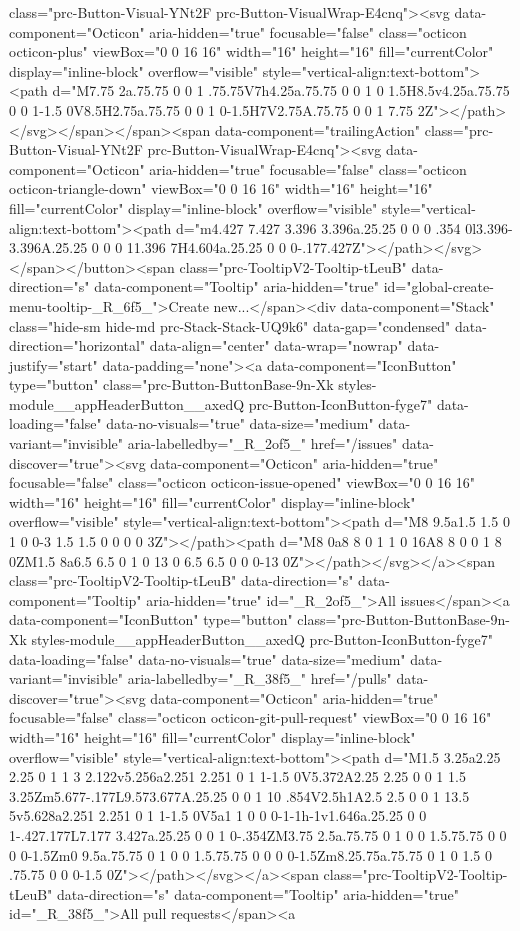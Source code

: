 {{{class="prc-Button-Visual-YNt2F prc-Button-VisualWrap-E4cnq"><svg data-component="Octicon" aria-hidden="true" focusable="false" class="octicon octicon-plus" viewBox="0 0 16 16" width="16" height="16" fill="currentColor" display="inline-block" overflow="visible" style="vertical-align:text-bottom"><path d="M7.75 2a.75.75 0 0 1 .75.75V7h4.25a.75.75 0 0 1 0 1.5H8.5v4.25a.75.75 0 0 1-1.5 0V8.5H2.75a.75.75 0 0 1 0-1.5H7V2.75A.75.75 0 0 1 7.75 2Z"></path></svg></span></span><span data-component="trailingAction" class="prc-Button-Visual-YNt2F prc-Button-VisualWrap-E4cnq"><svg data-component="Octicon" aria-hidden="true" focusable="false" class="octicon octicon-triangle-down" viewBox="0 0 16 16" width="16" height="16" fill="currentColor" display="inline-block" overflow="visible" style="vertical-align:text-bottom"><path d="m4.427 7.427 3.396 3.396a.25.25 0 0 0 .354 0l3.396-3.396A.25.25 0 0 0 11.396 7H4.604a.25.25 0 0 0-.177.427Z"></path></svg></span></button><span class="prc-TooltipV2-Tooltip-tLeuB" data-direction="s" data-component="Tooltip" aria-hidden="true" id="global-create-menu-tooltip-_R_6f5_">Create new...</span><div data-component="Stack" class="hide-sm hide-md prc-Stack-Stack-UQ9k6" data-gap="condensed" data-direction="horizontal" data-align="center" data-wrap="nowrap" data-justify="start" data-padding="none"><a data-component="IconButton" type="button" class="prc-Button-ButtonBase-9n-Xk styles-module__appHeaderButton__axedQ prc-Button-IconButton-fyge7" data-loading="false" data-no-visuals="true" data-size="medium" data-variant="invisible" aria-labelledby="_R_2of5_" href="/issues" data-discover="true"><svg data-component="Octicon" aria-hidden="true" focusable="false" class="octicon octicon-issue-opened" viewBox="0 0 16 16" width="16" height="16" fill="currentColor" display="inline-block" overflow="visible" style="vertical-align:text-bottom"><path d="M8 9.5a1.5 1.5 0 1 0 0-3 1.5 1.5 0 0 0 0 3Z"></path><path d="M8 0a8 8 0 1 1 0 16A8 8 0 0 1 8 0ZM1.5 8a6.5 6.5 0 1 0 13 0 6.5 6.5 0 0 0-13 0Z"></path></svg></a><span class="prc-TooltipV2-Tooltip-tLeuB" data-direction="s" data-component="Tooltip" aria-hidden="true" id="_R_2of5_">All issues</span><a data-component="IconButton" type="button" class="prc-Button-ButtonBase-9n-Xk styles-module__appHeaderButton__axedQ prc-Button-IconButton-fyge7" data-loading="false" data-no-visuals="true" data-size="medium" data-variant="invisible" aria-labelledby="_R_38f5_" href="/pulls" data-discover="true"><svg data-component="Octicon" aria-hidden="true" focusable="false" class="octicon octicon-git-pull-request" viewBox="0 0 16 16" width="16" height="16" fill="currentColor" display="inline-block" overflow="visible" style="vertical-align:text-bottom"><path d="M1.5 3.25a2.25 2.25 0 1 1 3 2.122v5.256a2.251 2.251 0 1 1-1.5 0V5.372A2.25 2.25 0 0 1 1.5 3.25Zm5.677-.177L9.573.677A.25.25 0 0 1 10 .854V2.5h1A2.5 2.5 0 0 1 13.5 5v5.628a2.251 2.251 0 1 1-1.5 0V5a1 1 0 0 0-1-1h-1v1.646a.25.25 0 0 1-.427.177L7.177 3.427a.25.25 0 0 1 0-.354ZM3.75 2.5a.75.75 0 1 0 0 1.5.75.75 0 0 0 0-1.5Zm0 9.5a.75.75 0 1 0 0 1.5.75.75 0 0 0 0-1.5Zm8.25.75a.75.75 0 1 0 1.5 0 .75.75 0 0 0-1.5 0Z"></path></svg></a><span class="prc-TooltipV2-Tooltip-tLeuB" data-direction="s" data-component="Tooltip" aria-hidden="true" id="_R_38f5_">All pull requests</span><a }}}
